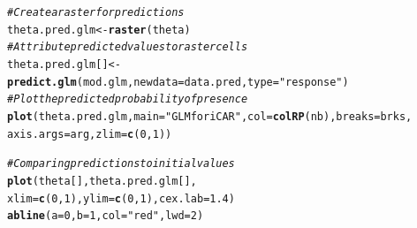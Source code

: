 \documentclass[a4paper, 12pt, leqno]{article}\usepackage[]{graphicx}\usepackage[]{color}
\makeatletter
\newcommand{\hlnum}[1]{\textcolor[rgb]{0.686,0.059,0.569}{#1}}%
\newcommand{\hlstr}[1]{\textcolor[rgb]{0.192,0.494,0.8}{#1}}%
\newcommand{\hlcom}[1]{\textcolor[rgb]{0.678,0.584,0.686}{\textit{#1}}}%
\newcommand{\hlstd}[1]{\textcolor[rgb]{0.345,0.345,0.345}{#1}}%
\newcommand{\hlkwb}[1]{\textcolor[rgb]{0.69,0.353,0.396}{#1}}%
\newcommand{\hlkwc}[1]{\textcolor[rgb]{0.333,0.667,0.333}{#1}}%
\newcommand{\hlkwd}[1]{\textcolor[rgb]{0.737,0.353,0.396}{\textbf{#1}}}%
\newenvironment{kframe}{%
 \def\at@end@of@kframe{}%
 \ifinner\ifhmode%
  \def\at@end@of@kframe{\end{minipage}}%
  \begin{minipage}{\columnwidth}%
 \fi\fi%
 \def\FrameCommand##1{\hskip\@totalleftmargin \hskip-\fboxsep
 \colorbox{shadecolor}{##1}\hskip-\fboxsep
     \hskip-\linewidth \hskip-\@totalleftmargin \hskip\columnwidth}%
 \MakeFramed {\advance\hsize-\width
   \@totalleftmargin\z@ \linewidth\hsize
   \@setminipage}}%
 {\par\unskip\endMakeFramed%
 \at@end@of@kframe}
\newenvironment{knitrout}{}{} %
\makeatother
\begin{document}
\begin{knitrout}\small
{}\color{fgcolor}\begin{kframe}
\begin{alltt}
\hlcom{# Create a raster for predictions}
\hlstd{theta.pred.glm} \hlkwb{<-} \hlkwd{raster}\hlstd{(theta)}
\hlcom{# Attribute predicted values to raster cells}
\hlstd{theta.pred.glm[]} \hlkwb{<-} \hlkwd{predict.glm}\hlstd{(mod.glm,}\hlkwc{newdata}\hlstd{=data.pred,}\hlkwc{type}\hlstd{=}\hlstr{"response"}\hlstd{)}
\hlcom{# Plot the predicted probability of presence}
\hlkwd{plot}\hlstd{(theta.pred.glm,}\hlkwc{main}\hlstd{=}\hlstr{"GLM for iCAR"}\hlstd{,}\hlkwc{col}\hlstd{=}\hlkwd{colRP}\hlstd{(nb),}\hlkwc{breaks}\hlstd{=brks,}
     \hlkwc{axis.args}\hlstd{=arg,}\hlkwc{zlim}\hlstd{=}\hlkwd{c}\hlstd{(}\hlnum{0}\hlstd{,}\hlnum{1}\hlstd{))}
\end{alltt}
\end{kframe}
\end{knitrout}


\begin{knitrout}\small
{}\color{fgcolor}\begin{kframe}
\begin{alltt}
\hlcom{# Comparing predictions to initial values}
\hlkwd{plot}\hlstd{(theta[],theta.pred.glm[],}
     \hlkwc{xlim}\hlstd{=}\hlkwd{c}\hlstd{(}\hlnum{0}\hlstd{,}\hlnum{1}\hlstd{),}\hlkwc{ylim}\hlstd{=}\hlkwd{c}\hlstd{(}\hlnum{0}\hlstd{,}\hlnum{1}\hlstd{),}\hlkwc{cex.lab}\hlstd{=}\hlnum{1.4}\hlstd{)}
\hlkwd{abline}\hlstd{(}\hlkwc{a}\hlstd{=}\hlnum{0}\hlstd{,}\hlkwc{b}\hlstd{=}\hlnum{1}\hlstd{,}\hlkwc{col}\hlstd{=}\hlstr{"red"}\hlstd{,}\hlkwc{lwd}\hlstd{=}\hlnum{2}\hlstd{)}
\end{alltt}
\end{kframe}
\end{knitrout}
\end{document}
